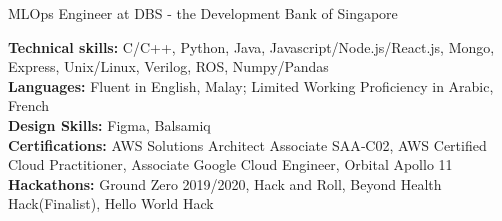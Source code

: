 

\begin{cvparagraph}

MLOps Engineer at DBS - the Development Bank of Singapore 

{\bfseries Technical skills:} C/C++, Python, Java, Javascript/Node.js/React.js, Mongo, Express, Unix/Linux, Verilog, ROS, Numpy/Pandas \\
{\bfseries Languages:} Fluent in English, Malay; Limited Working Proficiency in Arabic, French\\
{\bfseries Design Skills:} Figma, Balsamiq\\
{\bfseries Certifications:} AWS Solutions Architect Associate SAA‑C02, AWS Certified Cloud Practitioner, Associate Google Cloud Engineer, Orbital Apollo 11 \\
{\bfseries Hackathons:} Ground Zero 2019/2020, Hack and Roll, Beyond Health Hack(Finalist), Hello World Hack\\

\end{cvparagraph}

